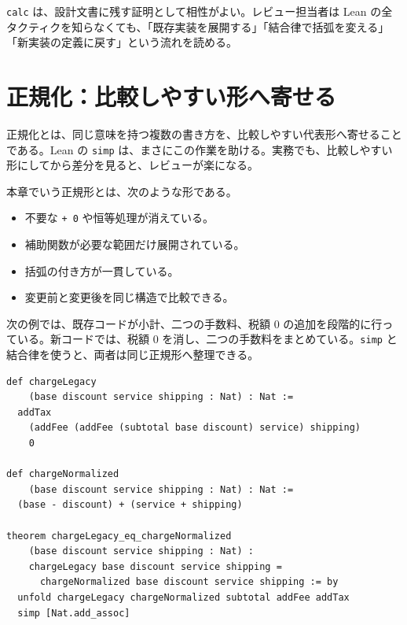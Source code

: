 \begin{softwarebox}
\texttt{calc} は、設計文書に残す証明として相性がよい。レビュー担当者は Lean の全タクティクを知らなくても、「既存実装を展開する」「結合律で括弧を変える」「新実装の定義に戻す」という流れを読める。
\end{softwarebox}

\section{正規化：比較しやすい形へ寄せる}

正規化とは、同じ意味を持つ複数の書き方を、比較しやすい代表形へ寄せることである。Lean の \texttt{simp} は、まさにこの作業を助ける。実務でも、比較しやすい形にしてから差分を見ると、レビューが楽になる。

\begin{definitionbox}
本章でいう正規形とは、次のような形である。
\begin{itemize}
\item 不要な \texttt{+ 0} や恒等処理が消えている。
\item 補助関数が必要な範囲だけ展開されている。
\item 括弧の付き方が一貫している。
\item 変更前と変更後を同じ構造で比較できる。
\end{itemize}
\end{definitionbox}


次の例では、既存コードが小計、二つの手数料、税額 0 の追加を段階的に行っている。新コードでは、税額 0 を消し、二つの手数料をまとめている。\texttt{simp} と結合律を使うと、両者は同じ正規形へ整理できる。

\begin{listing}[htbp]
\begin{verbatim}
def chargeLegacy
    (base discount service shipping : Nat) : Nat :=
  addTax
    (addFee (addFee (subtotal base discount) service) shipping)
    0

def chargeNormalized
    (base discount service shipping : Nat) : Nat :=
  (base - discount) + (service + shipping)

theorem chargeLegacy_eq_chargeNormalized
    (base discount service shipping : Nat) :
    chargeLegacy base discount service shipping =
      chargeNormalized base discount service shipping := by
  unfold chargeLegacy chargeNormalized subtotal addFee addTax
  simp [Nat.add_assoc]
\end{verbatim}
\caption{価格計算ロジックの正規化}
\label{lst:ch12-price-normalization}
\end{listing}

